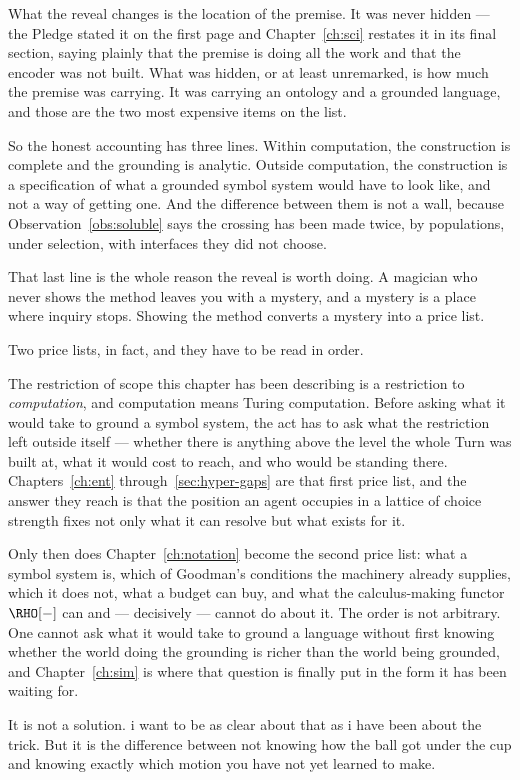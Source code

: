 What the reveal changes is the location of the premise.
It was never hidden --- the Pledge stated it on the first page and
Chapter~\ref{ch:sci} restates it in its final section, saying
plainly that the premise is doing all the work and that the encoder
was not built.
What was hidden, or at least unremarked, is how much the premise
was carrying.
It was carrying an ontology and a grounded language, and those are
the two most expensive items on the list.

So the honest accounting has three lines.
Within computation, the construction is complete and the grounding
is analytic.
Outside computation, the construction is a specification of what a
grounded symbol system would have to look like, and not a way of
getting one.
And the difference between them is not a wall, because
Observation~\ref{obs:soluble} says the crossing has been made
twice, by populations, under selection, with interfaces they did
not choose.

That last line is the whole reason the reveal is worth doing.
A magician who never shows the method leaves you with a mystery,
and a mystery is a place where inquiry stops.
Showing the method converts a mystery into a price list.

Two price lists, in fact, and they have to be read in order.

The restriction of scope this chapter has been describing is a
restriction to \emph{computation}, and computation means Turing
computation.
Before asking what it would take to ground a symbol system, the act has
to ask what the restriction left outside itself --- whether there is
anything above the level the whole Turn was built at, what it would cost
to reach, and who would be standing there.
Chapters~\ref{ch:ent} through~\ref{sec:hyper-gaps} are that first price
list, and the answer they reach is that the position an agent occupies
in a lattice of choice strength fixes not only what it can resolve but
what exists for it.

Only then does Chapter~\ref{ch:notation} become the second price list:
what a symbol system is, which of Goodman's conditions the machinery
already supplies, which it does not, what a budget can buy, and what the
calculus-making functor $\RHO[-]$ can and --- decisively --- cannot do
about it.
The order is not arbitrary.
One cannot ask what it would take to ground a language without first
knowing whether the world doing the grounding is richer than the world
being grounded, and Chapter~\ref{ch:sim} is where that question is
finally put in the form it has been waiting for.

It is not a solution.
i want to be as clear about that as i have been about the trick.
But it is the difference between not knowing how the ball got under
the cup and knowing exactly which motion you have not yet learned
to make.
